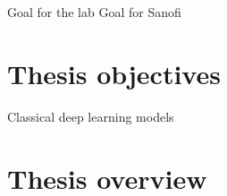 \documentclass[../main.tex]{subfiles}
\begin{document}
 Goal for the lab
 Goal for Sanofi

\section{Thesis objectives}
 \begin{description}[
		 style=multiline,
		 leftmargin=!,
		 labelwidth=\eqboxwidth{listlabel@\EnumitemId}, format=\mylabelformat
	 ]
	 \item[First objective] Classical deep learning models
	 \item[Second objective]
	 \item[Third objective]
 \end{description}



 \clearpage
\section{Thesis overview}
 \begin{center}
	 \ifSubfilesClassLoaded{%
	 }{
	 }
 \end{center}

\end{document}
